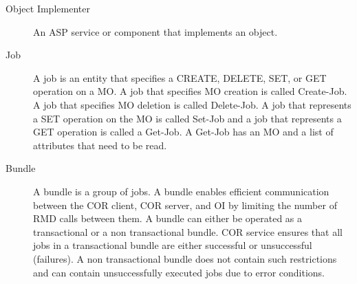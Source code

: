 \begin{flushleft}
\begin{Desc}
\begin{description}
\item[Object Implementer] An ASP service or component that implements an object.
\end{description}

\begin{description}
\item[Job] A job is an entity that specifies a CREATE, DELETE, SET, or GET operation on a MO. A job that specifies MO creation is called Create-Job. A job that
specifies MO deletion is called Delete-Job. A job that represents a SET operation on the MO is called Set-Job and a job that represents a GET operation 
is called a Get-Job. A Get-Job has an MO and a list of attributes that need to be read. 
\end{description}

\begin{description}
\item[Bundle] A bundle is a group of jobs. A bundle enables efficient communication between the COR client, COR server, and OI by limiting the number of
RMD calls between them. A bundle can either be operated as a transactional or a non transactional bundle. COR service ensures that all jobs in a 
transactional bundle are either successful or unsuccessful (failures). A non transactional bundle does not contain such restrictions and can
contain unsuccessfully executed jobs due to error conditions.
\end{description}

\end{Desc}

\end{flushleft}